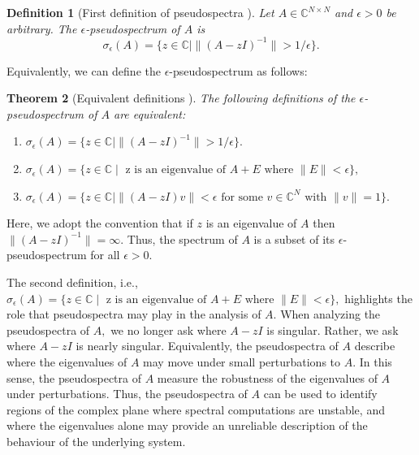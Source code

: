 \documentclass[12pt,a4paper]{article}
\theoremstyle{boldthm}
\newtheorem{theorem}{Theorem}[section]
\theoremstyle{bolddefn}
\newtheorem{definition}[theorem]{Definition}
\begin{document}

\begin{definition}[{First definition of pseudospectra \cite[2.1]{Nick}}]
    Let $A \in \mathbb{C}^{N \times N}$ and $\epsilon > 0$ be arbitrary. The $\epsilon$-pseudospectrum of $A$ is
    \begin{equation}
        \sigma_{\epsilon}(A) = \{ z \in \mathbb{C} \mid \| (A - zI)^{-1} \| > 1/ \epsilon \}.
    \end{equation}
\end{definition}
Equivalently, we can define the $\epsilon$-pseudospectrum as follows:
\begin{theorem}[{Equivalent definitions \cite[Theorem~2.1]{Nick}}]
    The following definitions of the $\epsilon$-pseudospectrum of $A$ are equivalent:
    \begin{enumerate}

        \item $\sigma_{\epsilon}(A) = \{ z \in \mathbb{C} \mid \| (A - zI)^{-1} \| > 1/ \epsilon \}.$
        
        \item $ \sigma_{\epsilon}(A) = \{z \in \mathbb{C} \mid \text{ z is an eigenvalue of } A + E \text{ where } \|E \| < \epsilon \},$

        \item $ \sigma_{\epsilon}(A) = \{z \in \mathbb{C} \mid \|(A-zI) v \| < \epsilon \text{ for some } v \in \mathbb{C}^N \text{ with }\|v \| = 1\}.$
    \end{enumerate}
\end{theorem}
Here, we adopt the convention that if $z$ is an eigenvalue of $A$ then $\| (A-zI)^{-1} \| =\infty.$ Thus, the spectrum of $A$ is a subset of its $\epsilon$-pseudospectrum for all $\epsilon > 0.$

The second definition, i.e., $ \sigma_{\epsilon}(A) = \{z \in \mathbb{C} \mid \text{ z is an eigenvalue of } A + E \text{ where } \|E \| < \epsilon \},$ highlights the role that pseudospectra may play in the analysis of $A.$ When analyzing the pseudospectra of $A,$ we no longer ask where $A-zI$ is singular. Rather, we ask where $A-zI$ is nearly singular.  Equivalently, the pseudospectra of $A$ describe where the eigenvalues of $A$ may move under small perturbations to $A$. In this sense, the pseudospectra of $A$ measure the robustness of the eigenvalues of $A$ under perturbations. Thus, the pseudospectra of $A$ can be used to identify regions of the complex plane where spectral computations are unstable, and where the eigenvalues alone may provide an unreliable description of the behaviour of the underlying system.
\end{document}
